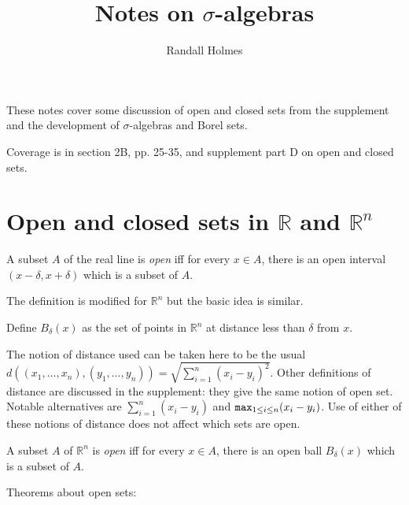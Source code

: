 \documentclass[12pt]{article}
\title{Notes on $\sigma$-algebras}
\author{Randall Holmes}
\begin{document}
\maketitle

These notes cover some discussion of open and closed sets from the supplement and the development of $\sigma$-algebras and Borel sets.

Coverage is in section 2B, pp. 25-35, and supplement part D on open and closed sets.

\section{Open and closed sets in $\mathbb R$ and $\mathbb R^n$}

A subset $A$ of the real line is {\em open} iff for every $x \in A$, there is an open interval $(x -\delta,x+\delta)$ which is a subset of $A$.

The definition is modified for $\mathbb R^n$ but the basic idea is similar. 

 Define $B_\delta(x)$ as the set of points in $\mathbb R^n$ at distance less than $\delta$ from $x$.

The notion of distance used can be taken here to be the usual $d((x_1,\ldots,x_n),(y_1,\ldots,y_n)) = \sqrt{\sum_{i=1}^n (x_i-y_i)^2}$.  Other definitions of distance are discussed in the supplement:  they give the same notion of open set.  Notable alternatives are $\sum_{i=1}^n (x_i-y_i)$ and ${\tt max}_{1 \leq i \leq n}(x_i-y_i)$.  Use of either of these notions of distance does not affect which sets are open.

A subset $A$ of $\mathbb R^n$ is {\em open} iff for every $x \in A$, there is an open ball $B_\delta(x)$ which is a subset of $A$.

Theorems about open sets:
\end{document}

